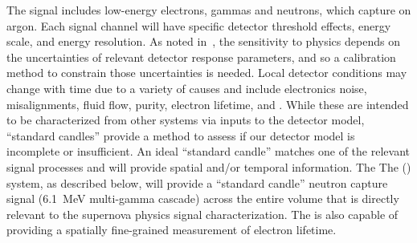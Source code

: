 

The  signal includes low-energy  electrons, gammas and neutrons, %
which capture on argon. Each signal channel will have specific detector threshold effects, energy scale, and energy resolution. 
As noted in~\physchsnb,
the sensitivity to  physics 
depends on the uncertainties of relevant detector response parameters, and so a calibration method to constrain those uncertainties is needed.
Local detector conditions may change with time due to a variety of 
causes and include electronics noise, misalignments, fluid flow,  purity, electron lifetime, and \efield. While these are intended to be characterized from other systems via inputs to the detector model, ``standard candles'' provide a method to assess if our detector model is incomplete or insufficient. An ideal ``standard candle'' matches one of the relevant signal processes and will provide spatial and/or temporal information. The The  () system, as described below, will provide a ``standard candle'' neutron capture signal (\SI{6.1}{\MeV} multi-gamma cascade) across the entire  volume that is directly relevant to the supernova physics signal characterization. The  is also capable of providing a spatially fine-grained measurement of electron lifetime. 



